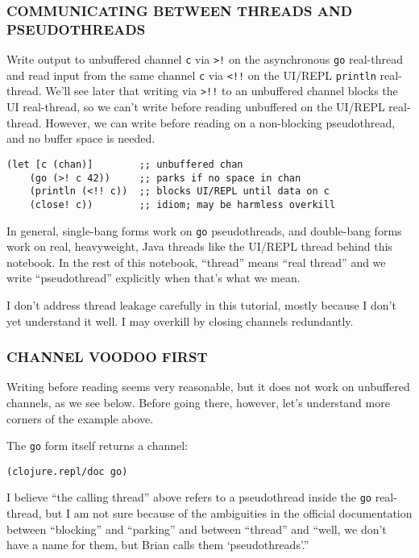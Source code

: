 \documentclass[10pt,oneside,x11names]{article}
\begin{document}
\subsubsection{COMMUNICATING BETWEEN THREADS AND PSEUDOTHREADS}
\label{communicating-between-threads-and-pseudothreads}
Write output to unbuffered channel \texttt{c} via \texttt{>!} on the asynchronous \texttt{go}
real-thread and read input from the same channel \texttt{c} via \texttt{<!!} on the
UI/REPL \texttt{println} real-thread. We'll see later that writing via \texttt{>!!} to
an unbuffered channel blocks the UI real-thread, so we can't write
before reading unbuffered on the UI/REPL real-thread. However, we can
write before reading on a non-blocking pseudothread, and no buffer space
is needed.

\begin{verbatim}
(let [c (chan)]        ;; unbuffered chan
    (go (>! c 42))     ;; parks if no space in chan
    (println (<!! c))  ;; blocks UI/REPL until data on c
    (close! c))        ;; idiom; may be harmless overkill
\end{verbatim}

In general, single-bang forms work on \texttt{go} pseudothreads, and
double-bang forms work on real, heavyweight, Java threads like the
UI/REPL thread behind this notebook. In the rest of this notebook,
``thread'' means ``real thread'' and we write ``pseudothread'' explicitly when
that's what we mean.

I don't address thread leakage carefully in this tutorial, mostly
because I don't yet understand it well. I may overkill by closing
channels redundantly.

\subsubsection{CHANNEL VOODOO FIRST}
\label{channel-voodoo-first}
Writing before reading seems very reasonable, but it does not work on
unbuffered channels, as we see below. Before going there, however, let's
understand more corners of the example above.

The \texttt{go} form itself returns a channel:

\begin{verbatim}
(clojure.repl/doc go)
\end{verbatim}

I believe ``the calling thread'' above refers to a pseudothread inside the
\texttt{go} real-thread, but I am not sure because of the ambiguities in the
official documentation between ``blocking'' and ``parking'' and between
``thread'' and ``well, we don't have a name for them, but Brian calls them
`pseudothreads'.''
\end{document}
